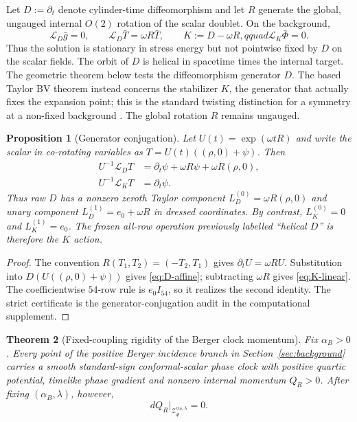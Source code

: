 \documentclass[11pt]{article}
\newtheorem{theorem}{Theorem}[section]
\newtheorem{proposition}[theorem]{Proposition}
\theoremstyle{definition}
\theoremstyle{remark}
\newcommand{\cL}{\mathcal L}
\begin{document}
Let $D:=\partial_t$ denote cylinder-time diffeomorphism and let $R$ generate
the global, ungauged internal $O(2)$ rotation of the scalar doublet.  On the
background,
\begin{equation}\label{eq:D-R-definition}
 \cL_D\bar g=0,\qquad \cL_D\bar T=\omega R\bar T,
 \qquad K:=D-\omega R,qquad \cL_K\bar\Phi=0.
\end{equation}
Thus the solution is stationary in stress energy but not pointwise fixed by
$D$ on the scalar fields.  The orbit of $D$ is helical in spacetime times the
internal target.  The geometric theorem below tests the diffeomorphism
generator $D$.  The based Taylor BV theorem instead concerns the stabilizer
$K$, the generator that actually fixes the expansion point; this is the
standard twisting distinction for a symmetry at a non-fixed background
\cite{LInfinityIntro}.  The global
rotation $R$ remains ungauged.

\begin{proposition}[Generator conjugation]\label{prop:generator-conjugation}
Let $U(t)=\exp(\omega tR)$ and write the scalar in co-rotating variables as
$T=U(t)((\rho,0)+\psi)$.  Then
\begin{align}
 U^{-1}\cL_DT
 &=\partial_t\psi+\omega R\psi+\omega R(\rho,0),
 \label{eq:D-affine}\\
 U^{-1}\cL_KT&=\partial_t\psi.\label{eq:K-linear}
\end{align}
Thus raw $D$ has a nonzero zeroth Taylor component
$L_D^{(0)}=\omega R(\rho,0)$ and unary component
$L_D^{(1)}=e_0+\omega R$ in dressed coordinates.  By contrast,
$L_K^{(0)}=0$ and $L_K^{(1)}=e_0$.  The frozen all-row operation previously
labelled ``helical $D$'' is therefore the $K$ action.
\end{proposition}

\begin{proof}
The convention $R(T_1,T_2)=(-T_2,T_1)$ gives
$\partial_tU=\omega RU$.  Substitution into $D(U((\rho,0)+\psi))$ gives
\eqref{eq:D-affine}; subtracting $\omega R$ gives \eqref{eq:K-linear}.
The coefficientwise $54$-row rule is $e_0I_{54}$, so it realizes the second
identity.  The strict certificate is the generator-conjugation audit in the
computational supplement.
\end{proof}

\begin{theorem}[Fixed-coupling rigidity of the Berger clock momentum]
\label{thm:rigidity}
Fix $\alpha_B>0$.  Every point of the positive Berger incidence branch in
Section~\ref{sec:background} carries a smooth standard-sign conformal-scalar
phase clock with positive quartic potential, timelike phase gradient and
nonzero internal momentum $Q_R>0$.  After fixing $(\alpha_B,\lambda)$,
however,
\begin{equation}\label{eq:main-rigidity}
 dQ_R\big|_{\mathcal Z_{\bar\Phi}^{\alpha_B,\lambda}}=0.
\end{equation}
\end{theorem}
\end{document}
